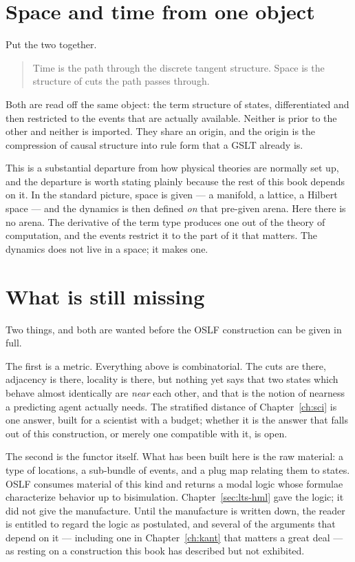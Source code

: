 \section{Space and time from one object}

Put the two together.

\begin{quote}
Time is the path through the discrete tangent structure.
Space is the structure of cuts the path passes through.
\end{quote}

Both are read off the same object: the term structure of states,
differentiated and then restricted to the events that are
actually available.
Neither is prior to the other and neither is imported.
They share an origin, and the origin is the compression of causal
structure into rule form that a GSLT already is.

This is a substantial departure from how physical theories are
normally set up, and the departure is worth stating plainly
because the rest of this book depends on it.
In the standard picture, space is given --- a manifold, a lattice,
a Hilbert space --- and the dynamics is then defined \emph{on}
that pre-given arena.
Here there is no arena.
The derivative of the term type produces one out of the theory of
computation, and the events restrict it to the part of it that
matters.
The dynamics does not live in a space; it makes one.

\section{What is still missing}

Two things, and both are wanted before the OSLF construction can
be given in full.

The first is a metric.
Everything above is combinatorial.
The cuts are there, adjacency is there, locality is there, but
nothing yet says that two states which behave almost identically
are \emph{near} each other, and that is the notion of nearness a
predicting agent actually needs.
The stratified distance of Chapter~\ref{ch:sci} is one answer,
built for a scientist with a budget; whether it is the answer that
falls out of this construction, or merely one compatible with it,
is open.

The second is the functor itself.
What has been built here is the raw material: a type of locations,
a sub-bundle of events, and a plug map relating them to states.
OSLF consumes material of this kind and returns a modal logic
whose formulae characterize behavior up to bisimulation.
Chapter~\ref{sec:lts-hml} gave the logic; it did not give the
manufacture.
Until the manufacture is written down, the reader is entitled to
regard the logic as postulated, and several of the arguments that
depend on it --- including one in
Chapter~\ref{ch:kant} that matters a great deal --- as resting on
a construction this book has described but not exhibited.
